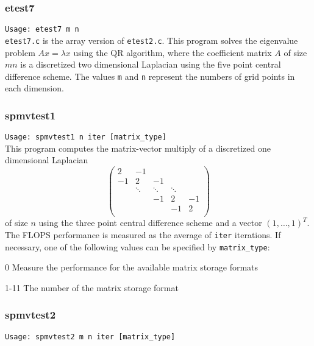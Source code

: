 \documentclass[a4paper]{article}
\newcommand{\namelistlabel}[1]{\mbox{#1}\hfill}
\newenvironment{namelist}[1]{%
\begin{list}{}
  {\let\makelabel\namelistlabel
  \settowidth{\labelwidth}{#1}
  \setlength{\leftmargin}{1.1\labelwidth}}
  }{%
\end{list}}
\begin{document}
\subsubsection{etest7}

\verb+Usage: etest7 m n+\\

{\tt etest7.c} is the array version of {\tt etest2.c}.
This program solves the eigenvalue problem $Ax = \lambda x$ using
the QR algorithm, where the 
coefficient matrix $A$ of size $mn$ is a discretized two dimensional Laplacian using the five
point central difference scheme. 
The values {\tt m} and {\tt n} represent the numbers of grid points
in each dimension. 

\subsubsection{spmvtest1}

\verb+Usage: spmvtest1 n iter [matrix_type]+\\

This program computes the matrix-vector multiply of a discretized one dimensional Laplacian
\[
\left(
\begin{array}{ccccc}
2 & -1 &   &  &   \\
-1 & 2 & -1 &  &   \\
  & \ddots  & \ddots  & \ddots  &   \\
  &   & -1 & 2 & -1 \\
  &   &   & -1 & 2 \\
\end{array}
\right)
\]
of size $n$ using the three point central difference scheme
and a vector $(1,\dots,1)^T$.
The FLOPS performance is measured as the average of {\tt iter}
iterations.
If necessary, one of the following values can be specified by {\tt matrix\_type}:
\begin{namelist}{XXXXXXXXXXXXXXXXXXXX}
\item[0] Measure the performance for the available matrix storage formats
\item[1-11] The number of the matrix storage format
\end{namelist}

\subsubsection{spmvtest2}

\verb+Usage: spmvtest2 m n iter [matrix_type]+\\
\end{document}
